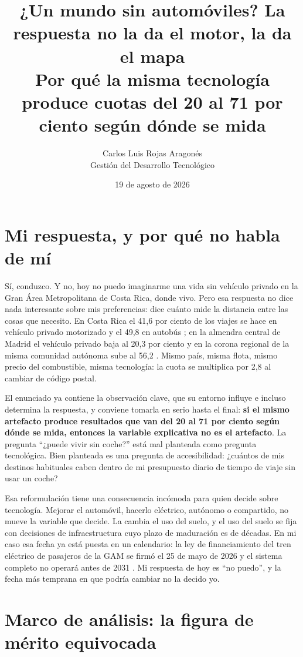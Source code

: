 \documentclass[11pt,letterpaper]{article}
\title{\vspace{-1.2cm}\textbf{¿Un mundo sin automóviles? La respuesta no la
da el motor, la da el mapa}\\
\large Por qué la misma tecnología produce cuotas del 20 al 71 por ciento
según dónde se mida}
\author{Carlos Luis Rojas Aragonés\\
\small Gestión del Desarrollo Tecnológico}
\date{\small 19 de agosto de 2026}
\begin{document}
\maketitle
\vspace{-0.6em}

\section{Mi respuesta, y por qué no habla de mí}

Sí, conduzco. Y no, hoy no puedo imaginarme una vida sin vehículo privado en
la Gran Área Metropolitana de Costa Rica, donde vivo. Pero esa respuesta no
dice nada interesante sobre mis preferencias: dice cuánto mide la distancia
entre las cosas que necesito. En Costa Rica el 41,6 por ciento de los viajes
se hace en vehículo privado motorizado y el 49,8 en autobús
\parencite{allen2024}; en la almendra central de Madrid el vehículo privado
baja al 20,3 por ciento y en la corona regional de la misma comunidad autónoma
sube al 56,2 \parencite{crtm2019}. Mismo país, misma flota, mismo precio del
combustible, misma tecnología: la cuota se multiplica por 2,8 al cambiar de
código postal.

El enunciado ya contiene la observación clave, que su entorno influye e
incluso determina la respuesta, y conviene tomarla en serio hasta el final:
\textbf{si el mismo artefacto produce resultados que van del 20 al 71 por
ciento según dónde se mida, entonces la variable explicativa no es el
artefacto}. La pregunta \enquote{¿puede vivir sin coche?} está mal planteada
como pregunta tecnológica. Bien planteada es una pregunta de accesibilidad:
¿cuántos de mis destinos habituales caben dentro de mi presupuesto diario de
tiempo de viaje sin usar un coche?

Esa reformulación tiene una consecuencia incómoda para quien decide sobre
tecnología. Mejorar el automóvil, hacerlo eléctrico, autónomo o compartido, no
mueve la variable que decide. La cambia el uso del suelo, y el uso del suelo se
fija con decisiones de infraestructura cuyo plazo de maduración es de décadas.
En mi caso esa fecha ya está puesta en un calendario: la ley de financiamiento
del tren eléctrico de pasajeros de la GAM se firmó el 25 de mayo de 2026
\parencite{incofer2026} y el sistema completo no operará antes de 2031
\parencite{teletica2026}. Mi respuesta de hoy es \enquote{no puedo}, y la
fecha más temprana en que podría cambiar no la decido yo.

\section{Marco de análisis: la figura de mérito equivocada}
\end{document}
